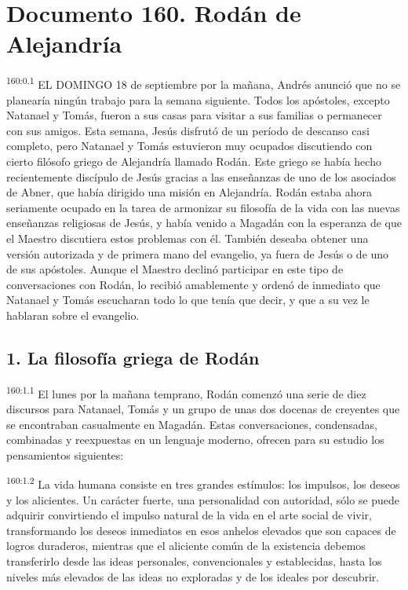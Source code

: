 \chapter{Documento 160. Rodán de Alejandría}
\par
\textsuperscript{160:0.1} EL DOMINGO 18 de septiembre por la mañana, Andrés anunció que no se planearía ningún trabajo para la semana siguiente. Todos los apóstoles, excepto Natanael y Tomás, fueron a sus casas para visitar a sus familias o permanecer con sus amigos. Esta semana, Jesús disfrutó de un período de descanso casi completo, pero Natanael y Tomás estuvieron muy ocupados discutiendo con cierto filósofo griego de Alejandría llamado Rodán. Este griego se había hecho recientemente discípulo de Jesús gracias a las enseñanzas de uno de los asociados de Abner, que había dirigido una misión en Alejandría. Rodán estaba ahora seriamente ocupado en la tarea de armonizar su filosofía de la vida con las nuevas enseñanzas religiosas de Jesús, y había venido a Magadán con la esperanza de que el Maestro discutiera estos problemas con él. También deseaba obtener una versión autorizada y de primera mano del evangelio, ya fuera de Jesús o de uno de sus apóstoles. Aunque el Maestro declinó participar en este tipo de conversaciones con Rodán, lo recibió amablemente y ordenó de inmediato que Natanael y Tomás escucharan todo lo que tenía que decir, y que a su vez le hablaran sobre el evangelio.

\section*{1. La filosofía griega de Rodán}
\par
\textsuperscript{160:1.1} El lunes por la mañana temprano, Rodán comenzó una serie de diez discursos para Natanael, Tomás y un grupo de unas dos docenas de creyentes que se encontraban casualmente en Magadán. Estas conversaciones, condensadas, combinadas y reexpuestas en un lenguaje moderno, ofrecen para su estudio los pensamientos siguientes:

\par
\textsuperscript{160:1.2} La vida humana consiste en tres grandes estímulos: los impulsos, los deseos y los alicientes. Un carácter fuerte, una personalidad con autoridad, sólo se puede adquirir convirtiendo el impulso natural de la vida en el arte social de vivir, transformando los deseos inmediatos en esos anhelos elevados que son capaces de logros duraderos, mientras que el aliciente común de la existencia debemos transferirlo desde las ideas personales, convencionales y establecidas, hasta los niveles más elevados de las ideas no exploradas y de los ideales por descubrir.

